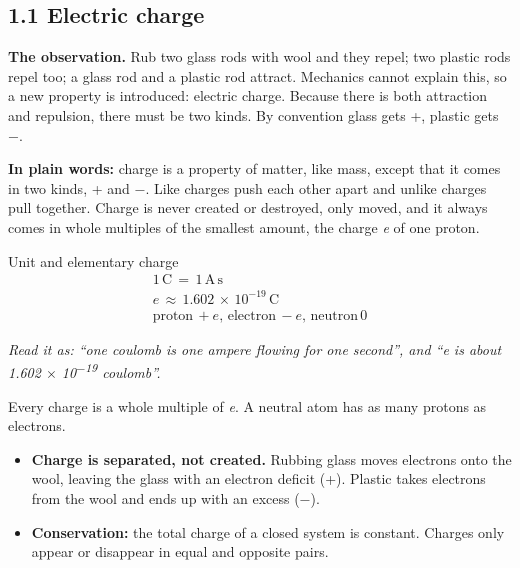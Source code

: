\documentclass[11pt]{article}
\begin{document}
\begin{keepsection}
\section{1.1 Electric charge}

\textbf{The observation.} Rub two glass rods with wool and they repel; two plastic rods repel too; a glass rod and a plastic rod attract. Mechanics cannot explain this, so a new property is introduced: electric charge. Because there is both attraction and repulsion, there must be two kinds. By convention glass gets +, plastic gets \ensuremath{-}.

\begin{plainbox}\textbf{In plain words:} charge is a property of matter, like mass, except that it comes in two kinds, + and \ensuremath{-}. Like charges push each other apart and unlike charges pull together. Charge is never created or destroyed, only moved, and it always comes in whole multiples of the smallest amount, the charge \textit{e} of one proton.\end{plainbox}

\begin{equationcard}{Unit and elementary charge}
\[ \begin{gathered} 1\, \mathrm{C}\, =\, 1\, \mathrm{A}\, \mathrm{s} \\ {e}\, \approx \, 1.602\, \times \, 10^{-19}\, \mathrm{C} \\ \text{proton}\, +{e},\, \text{electron}\, -{e},\, \text{neutron}\, 0 \end{gathered} \]
{\small \emph{Read it as: “one coulomb is one ampere flowing for one second”, and “e is about 1.602 \ensuremath{\times} 10\textsuperscript{\ensuremath{-}19} coulomb”.}\par Every charge is a whole multiple of \textit{e}. A neutral atom has as many protons as electrons.}
\end{equationcard}

\begin{itemize}
\item \textbf{Charge is separated, not created.} Rubbing glass moves electrons onto the wool, leaving the glass with an electron deficit (+). Plastic takes electrons from the wool and ends up with an excess (\ensuremath{-}).
\item \textbf{Conservation:} the total charge of a closed system is constant. Charges only appear or disappear in equal and opposite pairs.
\end{itemize}


\end{keepsection}
\end{document}
